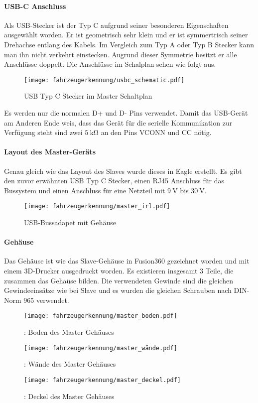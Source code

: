 \paragraph{USB-C Anschluss}\mbox{} 

Als USB-Stecker ist der Typ C aufgrund seiner besonderen Eigenschaften ausgewählt worden. Er ist geometrisch sehr klein und er ist symmertrisch seiner Drehachse entlang des Kabels. Im Vergleich zum Typ A oder Typ B Stecker 
kann man ihn nicht verkehrt einstecken. Augrund dieser Symmetrie besitzt er alle Anschlüsse doppelt. Die Anschlüsse im Schalplan sehen wie folgt aus.

\begin{figure}[H]
    \centering
    \texttt{[image: fahrzeugerkennung/usbc\_schematic.pdf]}
    \caption{USB Typ C Stecker im Master Schaltplan}
\end{figure}

Es werden nur die normalen D+ und D- Pins verwendet. Damit das USB-Gerät am Anderen Ende weis, dass das Gerät für die serielle Kommunikation zur Verfügung steht sind zwei $\SI{5}{\kilo\ohm}$ an den Pins VCONN und CC nötig.

\paragraph{Layout des Master-Geräts} \mbox{} 

Genau gleich wie das Layout des Slaves wurde dieses in Eagle erstellt. Es gibt den zuvor erwähnten USB Typ C Stecker, einen RJ45 Anschluss für das Bussystem und einen Anschluss für eine Netzteil mit $\SI{9}{\volt}$ bis 
$\SI{30}{\volt}$.

\begin{figure}[H]
    \centering
    \texttt{[image: fahrzeugerkennung/master\_irl.pdf]}
    \caption{USB-Bussadapet mit Gehäuse}
\end{figure}

\paragraph{Gehäuse}\mbox{} 
Das Gehäuse ist wie das Slave-Gehäuse in Fusion360 gezeichnet worden und mit einem 3D-Drucker ausgedruckt worden. Es existieren insgesamt 3 Teile, die zusammen das Gehaüse bilden.
Die verwendeten Gewinde sind die gleichen Gewindeeinsätze wie bei Slave und es wurden die gleichen Schrauben nach DIN-Norm 965 verwendet.

\begin{figure}[!htb]
        \texttt{[image: fahrzeugerkennung/master\_boden.pdf]}
        \caption{: Boden des Master Gehäuses}
    \endminipage\hfill
        \texttt{[image: fahrzeugerkennung/master\_wände.pdf]}
        \caption{: Wände des Master Gehäuses}
    \endminipage\hfill
        \texttt{[image: fahrzeugerkennung/master\_deckel.pdf]}
        \caption{: Deckel des Master Gehäuses}
    \endminipage
\end{figure}

